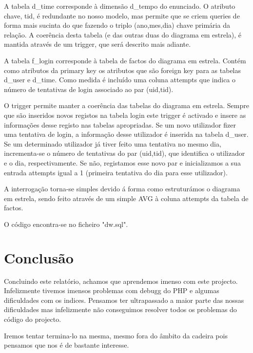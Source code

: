 \documentclass[11pt,a4paper]{article}
\begin{document}
A tabela d\_time corresponde à dimensão d\_tempo do enunciado. O atributo chave, tid, é redundante
no nosso modelo, mas permite que se criem queries de forma mais sucinta do que
fazendo o triplo (ano,mes,dia) chave primária da relação. A coerência desta
tabela (e das outras duas do diagrama em estrela), é mantida através de um
trigger, que será descrito mais adiante.

A tabela f\_login corresponde à tabela de factos do diagrama em estrela. Contém como atributos da
primary key os atributos que são foreign key para as tabelas d\_user e d\_time.
Como medida é incluído uma coluna attempts que indica o número de tentativas de
login associado ao par (uid,tid).

O trigger permite manter a coerência das tabelas do diagrama em estrela. Sempre que
são inseridos novos registos na tabela login este trigger é activado e insere as
informações desse registo nas tabelas apropriadas.
Se um novo utilizador fizer uma tentativa de login, a informação desse utilizador é
inserida na tabela d\_user.
Se um determinado utilizador já tiver feito uma tentativa no mesmo dia,
incrementa-se o número de tentativas do par (uid,tid), que identifica o
utilizador e o dia, respectivamente. Se não, registamos esse novo par e
inicializamos a sua entrada attempts igual a 1 (primeira tentativa do dia
para esse utilizador).

A interrogação torna-se simples devido á forma como estruturámos o diagrama em estrela, sendo feito
através de um simple AVG à coluna attempts da tabela de factos.

O código encontra-se no ficheiro "dw.sql".
\newpage

\section{Conclusão}

Concluindo este relatório, achamos que aprendemos imenso com este projecto. Infelizmente tivemos imensos problemas com debugg do PHP e algumas dificuldades com os indices. Pensamos ter ultrapassado a maior parte das nossas dificuldades mas infelizmente não conseguimos resolver todos os problemas do código do projecto.

Iremos tentar termina-lo na mesma, mesmo fora do âmbito da cadeira pois pensamos que nos é de bastante interesse.
\newpage
\end{document}
